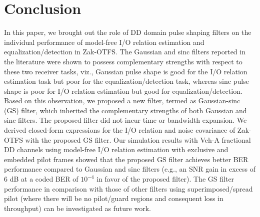 \vspace{-2mm}
\section{Conclusion}
\label{sec6}
In this paper, we brought out the role of DD domain pulse shaping filters on the individual performance of model-free I/O relation estimation and equalization/detection in Zak-OTFS. The Gaussian and sinc filters reported in the literature were shown to possess complementary strengths with respect to these two receiver tasks, viz., Gaussian pulse shape is good for the I/O relation estimation task but poor for the equalization/detection task, whereas sinc pulse shape is poor for I/O relation estimation but good for equalization/detection. Based on this observation, we proposed a new filter, termed as Gaussian-sinc (GS) filter, which inherited the complementary strengths of both Gaussian and sinc filters. The proposed filter did not incur time or bandwidth expansion. We derived closed-form expressions for the I/O relation and noise covariance of Zak-OTFS with the proposed GS filter. Our simulation results with Veh-A fractional DD channels using model-free I/O relation estimation with exclusive and embedded pilot frames showed that the proposed GS filter achieves better BER performance compared to Gaussian and sinc filters (e.g., an SNR gain in excess of 6 dB at a coded BER of $10^{-4}$ in favor of the proposed filter). The GS filter performance in comparison with those of other filters using superimposed/spread pilot (where there will be no pilot/guard regions and consequent loss in throughput) can be investigated as future work. 











